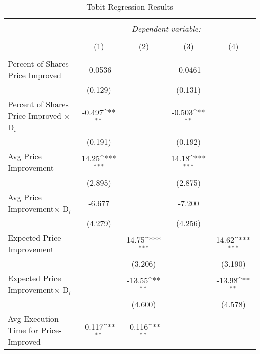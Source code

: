 \documentclass[12pt,a4paper]{article}
\def\sym#1{\ifmmode^{#1}\else\(^{#1}\)\fi}
\begin{document}
\begin{table}[ht] 
	\caption{Tobit Regression Results} 
	\label{} 
	\footnotesize
	\begin{tabular}{@{\extracolsep{0.6em}}lcccc} 
		\\[-4ex]\hline  
		\hline \\[-1.8ex]  
		& \multicolumn{4}{c}{\textit{Dependent variable:}} \\  
		\cline{2-5}  
		\\[-1.8ex] & (1) & (2) & (3) & (4)\\  
		\hline \\[-1.8ex]  
				Percent of Shares Price Improved   &     -0.0536         &                     &     -0.0461         &                     \\
		&     (0.129)         &                     &     (0.131)         &                     \\
		[0.5em]
		Percent of Shares Price Improved  $\times$ D$_i$  &  -0.497\sym{**} &                     &      -0.503\sym{**} &                     \\
		&     (0.191)         &                     &     (0.192)         &                     \\
		[0.5em]
		Avg Price Improvement&       14.25\sym{***}&                     &       14.18\sym{***}&                     \\
		&     (2.895)         &                     &     (2.875)         &                     \\
		[0.5em]
		Avg Price Improvement$\times$ D$_i$&      -6.677         &                     &      -7.200         &                     \\
		&     (4.279)         &                     &     (4.256)         &                     \\
		[0.5em]
		Expected Price Improvement&                     &       14.75\sym{***}&                     &       14.62\sym{***}\\
		&                     &     (3.206)         &                     &     (3.190)         \\
		[0.5em]
		Expected Price Improvement$\times$ D$_i$&                     &      -13.55\sym{**} &                     &      -13.98\sym{**} \\
		&                     &     (4.600)         &                     &     (4.578)         \\
		[0.5em]
		Avg Execution Time for Price-Improved  &      -0.117\sym{**} &      -0.116\sym{**} &                     &                     \\

\end{tabular}
\end{table}
\end{document}
